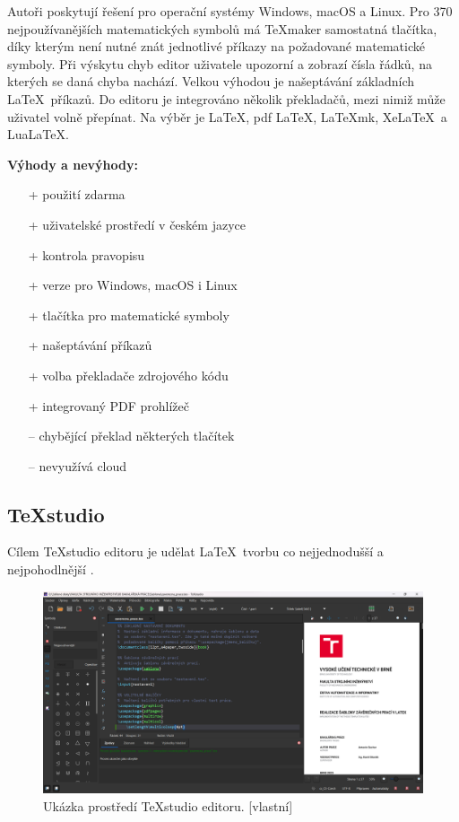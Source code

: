 Autoři poskytují řešení pro operační systémy Windows, macOS a Linux. Pro 370 nejpoužívanějších matematických symbolů má \TeX maker samostatná tlačítka, díky kterým není nutné znát jednotlivé příkazy na požadované matematické symboly. Při výskytu chyb editor uživatele upozorní a zobrazí čísla řádků, na kterých se daná chyba nachází. Velkou výhodou je našeptávání základních \LaTeX\ příkazů. Do editoru je integrováno několik překladačů, mezi nimiž může uživatel volně přepínat. Na výběr je \LaTeX, pdf \LaTeX, \LaTeX mk, Xe\LaTeX\ a Lua\LaTeX. \cite{texmaker}

\textbf{Výhody a nevýhody:}
\begin{multicols}{2}
	\begin{itemize}
		\item [+] použití zdarma
		\item [+] uživatelské prostředí v českém jazyce
		\item [+] kontrola pravopisu
		\item [+] verze pro Windows, macOS i Linux
		\item [+] tlačítka pro matematické symboly
		\item [+] našeptávání příkazů
		\item [+] volba překladače zdrojového kódu
		\item [+] integrovaný PDF prohlížeč
	\columnbreak
		\item [--] chybějící překlad některých tlačítek
		\item [--] nevyužívá cloud
	\end{itemize}
\end{multicols}

\subsection{\TeX studio}
Cílem \TeX studio editoru je udělat \LaTeX\ tvorbu co nejjednodušší a nejpohodlnější \cite{Texstudio}.

\begin{figure}[h]
	\centering
	\includegraphics[width=\textwidth]{obrázky/texstudio.png}
	\caption[Ukázka prostředí \TeX studio editoru.]{Ukázka prostředí \TeX studio editoru. [vlastní]}
	\label{fig:texstudio}
\end{figure}

